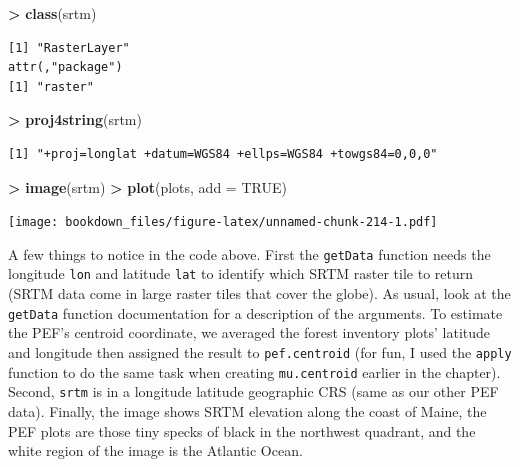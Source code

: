 \documentclass[
]{krantz}
\makeatletter
\newenvironment{Shaded}{\begin{snugshade}}{\end{snugshade}}
\newcommand{\DataTypeTok}[1]{\textcolor[rgb]{0.27,0.27,0.27}{#1}}
\newcommand{\KeywordTok}[1]{\textcolor[rgb]{0.27,0.27,0.27}{\textbf{#1}}}
\newcommand{\NormalTok}[1]{#1}
\newcommand{\OperatorTok}[1]{\textcolor[rgb]{0.43,0.43,0.43}{\textbf{#1}}}
\newcommand{\OtherTok}[1]{\textcolor[rgb]{0.37,0.37,0.37}{#1}}
\newcommand{\StringTok}[1]{\textcolor[rgb]{0.5,0.5,0.5}{#1}}
\newenvironment{kframe}{%
\medskip{}
\setlength{\fboxsep}{.8em}
 \def\at@end@of@kframe{}%
 \ifinner\ifhmode%
  \def\at@end@of@kframe{\end{minipage}}%
  \begin{minipage}{\columnwidth}%
 \fi\fi%
 \def\FrameCommand##1{\hskip\@totalleftmargin \hskip-\fboxsep
 \colorbox{shadecolor}{##1}\hskip-\fboxsep
     \hskip-\linewidth \hskip-\@totalleftmargin \hskip\columnwidth}%
 \MakeFramed {\advance\hsize-\width
   \@totalleftmargin\z@ \linewidth\hsize
   \@setminipage}}%
 {\par\unskip\endMakeFramed%
 \at@end@of@kframe}
\renewenvironment{Shaded}{\begin{kframe}}{\end{kframe}}
\makeatother
\begin{document}
\begin{Shaded}
\begin{Highlighting}[]
\OperatorTok{\textgreater{}}\StringTok{ }\KeywordTok{class}\NormalTok{(srtm)}
\end{Highlighting}
\end{Shaded}

\begin{verbatim}
[1] "RasterLayer"
attr(,"package")
[1] "raster"
\end{verbatim}

\begin{Shaded}
\begin{Highlighting}[]
\OperatorTok{\textgreater{}}\StringTok{ }\KeywordTok{proj4string}\NormalTok{(srtm)}
\end{Highlighting}
\end{Shaded}

\begin{verbatim}
[1] "+proj=longlat +datum=WGS84 +ellps=WGS84 +towgs84=0,0,0"
\end{verbatim}

\begin{Shaded}
\begin{Highlighting}[]
\OperatorTok{\textgreater{}}\StringTok{ }\KeywordTok{image}\NormalTok{(srtm)}
\OperatorTok{\textgreater{}}\StringTok{ }\KeywordTok{plot}\NormalTok{(plots, }\DataTypeTok{add =} \OtherTok{TRUE}\NormalTok{)}
\end{Highlighting}
\end{Shaded}

\texttt{[image: bookdown\_files/figure-latex/unnamed-chunk-214-1.pdf]}

A few things to notice in the code above. First the \texttt{getData} function needs the longitude \texttt{lon} and latitude \texttt{lat} to identify which SRTM raster tile to return (SRTM data come in large raster tiles that cover the globe). As usual, look at the \texttt{getData} function documentation for a description of the arguments. To estimate the PEF's centroid coordinate, we averaged the forest inventory plots' latitude and longitude then assigned the result to \texttt{pef.centroid} (for fun, I used the \texttt{apply} function to do the same task when creating \texttt{mu.centroid} earlier in the chapter). Second, \texttt{srtm} is in a longitude latitude geographic CRS (same as our other PEF data). Finally, the image shows SRTM elevation along the coast of Maine, the PEF plots are those tiny specks of black in the northwest quadrant, and the white region of the image is the Atlantic Ocean.
\end{document}

